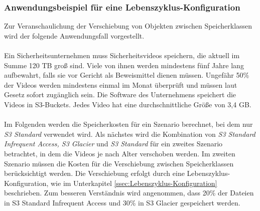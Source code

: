 \subsubsection{Anwendungsbeispiel für eine Lebenszyklus-Konfiguration}\label{Anwendungsbeispiel-Leben-Konfig}
Zur Veranschaulichung der Verschiebung von Objekten zwischen Speicherklassen wird der folgende Anwendungsfall vorgestellt.%
\\\\
Ein Sicherheitsunternehmen muss Sicherheitsvideos speichern, die aktuell im Summe 120 TB groß sind. Viele von ihnen werden mindestens fünf Jahre lang aufbewahrt, falls sie vor Gericht als Beweismittel dienen müssen. Ungefähr 50\% der Videos werden mindestens einmal im Monat überprüft und müssen laut Gesetz sofort zugänglich sein. Die Software des Unternehmens speichert die Videos in S3-Buckets. Jedes Video hat eine durchschnittliche Größe von 3,4 GB.
\\\\
Im Folgenden werden die Speicherkosten für ein Szenario berechnet, bei dem nur \textit{S3 Standard} verwendet wird. Als nächstes wird die Kombination von \textit{S3 Standard Infrequent Access, S3 Glacier} und \textit{S3 Standard} für ein zweites Szenario betrachtet, in dem die Videos je nach Alter verschoben werden. Im zweiten Szenario müssen die Kosten für die Verschiebung zwischen Speicherklassen berücksichtigt werden. Die Verschiebung erfolgt durch eine Lebenszyklus-Konfiguration, wie im Unterkapitel \ref{ssec:Lebenszyklus-Konfiguration} beschrieben. Zum besseren Verständnis wird angenommen, dass 20\% der Dateien in S3 Standard Infrequent Access und 30\% in S3 Glacier gespeichert werden.
\newpage

